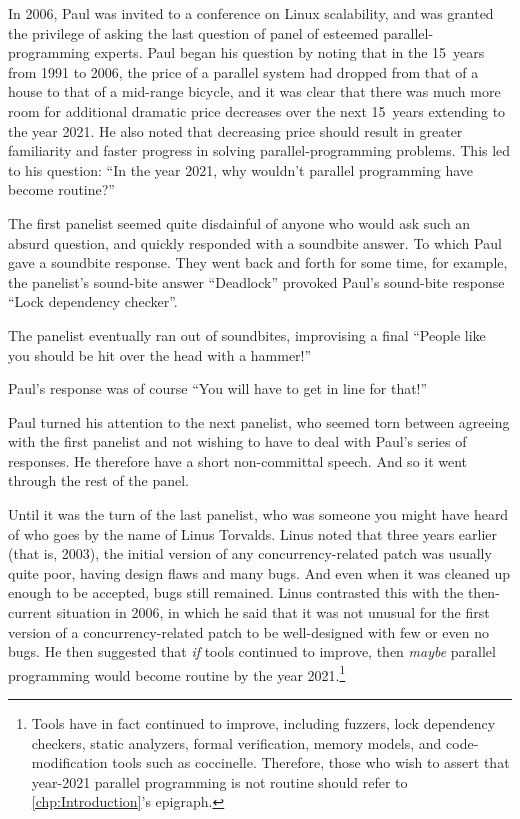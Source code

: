 In 2006, Paul was invited to a conference on Linux scalability, and was
granted the privilege of asking the last question of panel of esteemed
parallel-programming experts.
Paul began his question by noting that in the 15~years from 1991 to 2006,
the price of a parallel system had dropped from that of a house to that
of a mid-range bicycle, and it was clear that there was much more room
for additional dramatic price decreases over the next 15~years
extending to the year 2021.
He also noted that decreasing price should result in greater familiarity
and faster progress in solving parallel-programming problems.
This led to his question:
``In the year 2021, why wouldn't parallel programming have become routine?''

The first panelist seemed quite disdainful of anyone who would ask such
an absurd question, and quickly responded with a soundbite answer.
To which Paul gave a soundbite response.
They went back and forth for some time, for example, the panelist's
sound-bite answer ``Deadlock'' provoked Paul's sound-bite response ``Lock
dependency checker''.

The panelist eventually ran out of soundbites, improvising a final
``People like you should be hit over the head with a hammer!''

Paul's response was of course ``You will have to get in line for that!''

Paul turned his attention to the next panelist, who seemed torn between
agreeing with the first panelist and not wishing to have to deal with
Paul's series of responses.
He therefore have a short non-committal speech.
And so it went through the rest of the panel.

Until it was the turn of the last panelist, who was someone you might have
heard of who goes by the name of Linus Torvalds.
Linus noted that three years earlier (that is, 2003), the initial version
of any concurrency-related patch was usually quite poor, having design
flaws and many bugs.
And even when it was cleaned up enough to be accepted, bugs still
remained.
Linus contrasted this with the then-current situation in 2006, in which
he said that it was not unusual for the first version of a concurrency-related
patch to be well-designed with few or even no bugs.
He then suggested that \emph{if} tools continued to improve, then \emph{maybe}
parallel programming would become routine by the year 2021.\footnote{
	Tools have in fact continued to improve, including fuzzers,
	lock dependency checkers, static analyzers, formal verification,
	memory models, and code-modification tools such as coccinelle.
	Therefore, those who wish to assert that year-2021
	parallel programming is not routine should refer to
	\cref{chp:Introduction}'s epigraph.}

